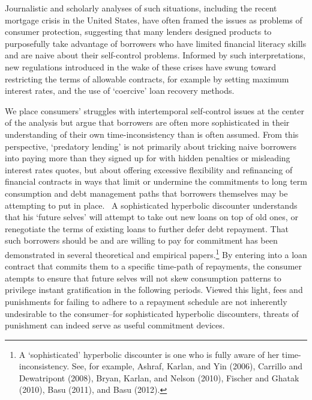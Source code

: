\documentclass[11pt]{article}%
\begin{document}
Journalistic and scholarly analyses of such situations, including the recent
mortgage crisis in the United States, have often framed the issues as problems
of consumer protection, suggesting that many lenders designed products to
purposefully take advantage of borrowers who have limited financial literacy
skills and are naive about their self-control problems. Informed by such
interpretations, new regulations introduced in the wake of these crises have
swung toward restricting the terms of allowable contracts, for example by
setting maximum interest rates, and the use of `coercive' loan recovery methods.

We place consumers' struggles with intertemporal self-control issues at the
center of the analysis but argue that borrowers are often more sophisticated
in their understanding of their own time-inconsistency than is often assumed.
From this perspective, `predatory lending' is not primarily about tricking
naive borrowers into paying more than they signed up for with hidden penalties
or misleading interest rates quotes, but about offering excessive flexibility
and refinancing of financial contracts in ways that limit or undermine the
commitments to long term consumption and debt management paths that borrowers
themselves may be attempting to put in place. \ A sophisticated hyperbolic
discounter understands that his `future selves' will attempt to take out new
loans on top of old ones, or renegotiate the terms of existing loans to
further defer debt repayment. That such borrowers should be and are willing to
pay for commitment has been demonstrated in several theoretical and empirical
papers.\footnote{A `sophisticated' hyperbolic discounter is one who is fully
aware of her time-inconsistency. See, for example, Ashraf, Karlan, and Yin
(2006), Carrillo and Dewatripont (2008), Bryan, Karlan, and Nelson (2010),
Fischer and Ghatak (2010), Basu (2011), and Basu (2012).} By entering into a
loan contract that commits them to a specific time-path of repayments, the
consumer atempts to ensure that future selves will not skew consumption
patterns to privilege instant gratification in the following periods. Viewed
this light, fees and punishments for failing to adhere to a repayment schedule
are not inherently undesirable to the consumer--for sophisticated hyperbolic
discounters, threats of punishment can indeed serve as useful commitment devices.
\end{document}
